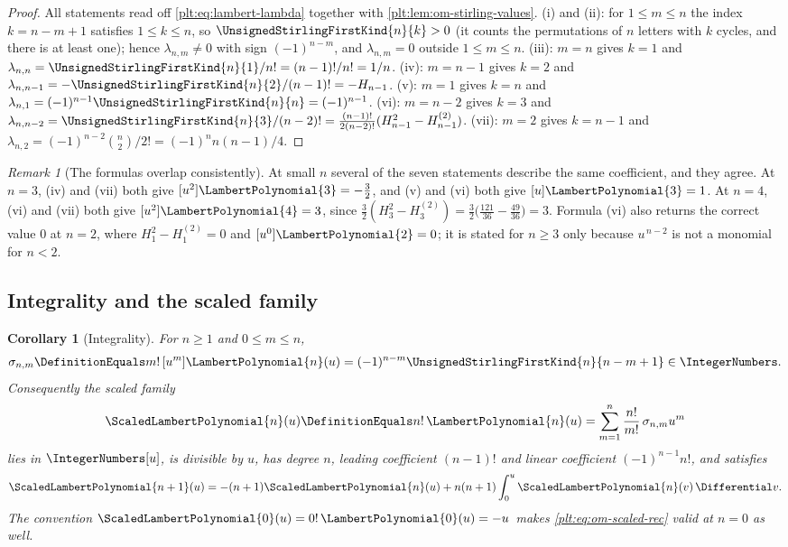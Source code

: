 \documentclass[11pt,oneside]{article}
\theoremstyle{plain}
\newtheorem{corollary}[theorem]{Corollary}
\theoremstyle{definition}
\theoremstyle{remark}
\newtheorem{remark}[theorem]{Remark}
\newcommand{\stirlingone}[2]{\UnsignedStirlingFirstKind{#1}{#2}}
\newcommand{\LamP}[1]{\LambertPolynomial{#1}}
\newcommand{\LamPsc}[1]{\ScaledLambertPolynomial{#1}}
\begin{document}
\begin{proof}
All statements read off \eqref{plt:eq:lambert-lambda} together with
\cref{plt:lem:om-stirling-values}.  (i) and (ii): for \(1\le m\le n\) the
index \(k=n-m+1\) satisfies \(1\le k\le n\), so \(\stirlingone{n}{k}>0\)
(it counts the permutations of \(n\) letters with \(k\) cycles, and there is
at least one); hence \(\lambda_{n,m}\ne0\) with sign \((-1)^{n-m}\), and
\(\lambda_{n,m}=0\) outside \(1\le m\le n\).  (iii): \(m=n\) gives
\(k=1\) and \(\lambda_{n,n}=\stirlingone{n}{1}/n!=(n-1)!/n!=1/n\).  (iv):
\(m=n-1\) gives \(k=2\) and
\(\lambda_{n,n-1}=-\stirlingone{n}{2}/(n-1)!=-H_{n-1}\).  (v): \(m=1\) gives
\(k=n\) and \(\lambda_{n,1}=(-1)^{n-1}\stirlingone{n}{n}=(-1)^{n-1}\).
(vi): \(m=n-2\) gives \(k=3\) and
\(\lambda_{n,n-2}=\stirlingone{n}{3}/(n-2)!
=\frac{(n-1)!}{2(n-2)!}(H_{n-1}^{2}-H_{n-1}^{(2)})\).
(vii): \(m=2\) gives \(k=n-1\) and
\(\lambda_{n,2}=(-1)^{n-2}\binom{n}{2}/2!=(-1)^{n}n(n-1)/4\).
\end{proof}

\begin{remark}[The formulas overlap consistently]
\label{plt:rmk:om-overlap}
At small \(n\) several of the seven statements describe the same
coefficient, and they agree.  At \(n=3\), (iv) and (vii) both give
\([u^{2}]\LamP{3}=-\tfrac32\), and (v) and (vi) both give
\([u]\LamP{3}=1\).  At \(n=4\), (vi) and (vii) both give
\([u^{2}]\LamP{4}=3\), since
\(\tfrac32(H_3^{2}-H_3^{(2)})=\tfrac32\bigl(\tfrac{121}{36}-\tfrac{49}{36}\bigr)=3\).
Formula (vi) also returns the correct value \(0\) at \(n=2\), where
\(H_1^{2}-H_1^{(2)}=0\) and \([u^{0}]\LamP{2}=0\); it is stated for
\(n\ge3\) only because \(u^{\,n-2}\) is not a monomial for \(n<2\).
\end{remark}

\subsection{Integrality and the scaled family}

\begin{corollary}[Integrality]
\label{plt:cor:lambert-integrality}
For \(n\ge1\) and \(0\le m\le n\),
\begin{equation}\label{plt:eq:om-sigma-integral}
 \sigma_{n,m}\DefinitionEquals m!\,[u^{m}]\LamP{n}(u)
 =(-1)^{n-m}\stirlingone{n}{n-m+1}\in\IntegerNumbers .
\end{equation}
Consequently the scaled family
\begin{equation}\label{plt:eq:om-scaled-def}
 \LamPsc{n}(u)\DefinitionEquals n!\,\LamP{n}(u)
 =\sum_{m=1}^{n}\frac{n!}{m!}\,\sigma_{n,m}u^{m}
\end{equation}
lies in \(\IntegerNumbers[u]\), is divisible by \(u\), has degree \(n\),
leading coefficient \((n-1)!\) and linear coefficient
\((-1)^{n-1}n!\), and satisfies
\begin{equation}\label{plt:eq:om-scaled-rec}
 \LamPsc{n+1}(u)=-(n+1)\LamPsc{n}(u)+n(n+1)\int_{0}^{u}\LamPsc{n}(v)\,\Differential v .
\end{equation}
The convention \(\LamPsc{0}(u)=0!\,\LamP{0}(u)=-u\) makes
\eqref{plt:eq:om-scaled-rec} valid at \(n=0\) as well.
\end{corollary}
\end{document}
